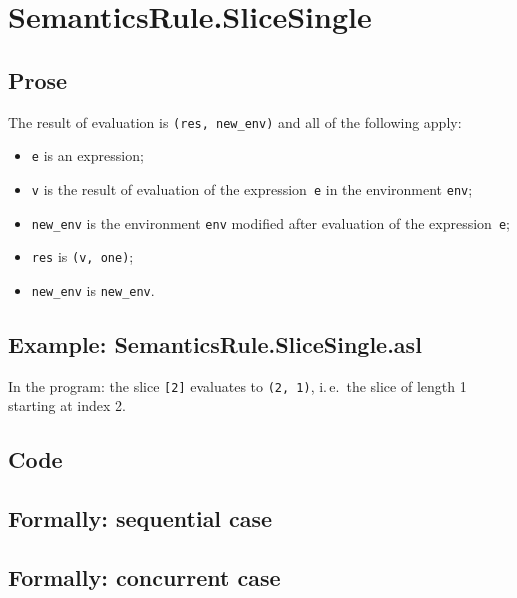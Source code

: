 \documentclass{book}
\begin{document}
\section{SemanticsRule.SliceSingle \label{sec:SemanticsRule.SliceSingle}}

  \subsection{Prose}
  The result of evaluation is \texttt{(res, new\_env)} and all
of the following apply:
  \begin{itemize}
  \item \texttt{e} is an expression;
  \item \texttt{v} is the result of evaluation of the expression~\texttt{e} in the environment \texttt{env};
  \item \texttt{new\_env} is the environment \texttt{env} modified after evaluation of the expression~\texttt{e};
  \item \texttt{res} is \texttt{(v, one)};
  \item \texttt{new\_env} is \texttt{new\_env}.
  \end{itemize}

  \subsection{Example: SemanticsRule.SliceSingle.asl}
  In the program:
  the slice \texttt{[2]} evaluates to \texttt{(2, 1)}, i.\,e.\ the slice of
  length 1 starting at index 2.

  \subsection{Code}

\begin{emptyformal}
  \subsection{Formally: sequential case}

  \subsection{Formally: concurrent case}
\end{emptyformal}
\end{document}
